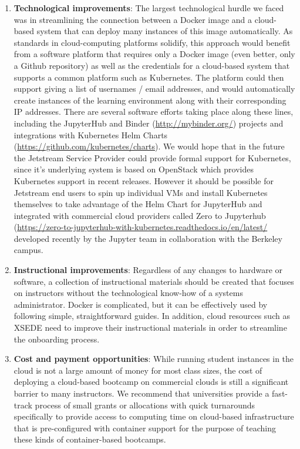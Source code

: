 \begin{enumerate}

\item {\bf Technological improvements}: The largest technological hurdle we
faced was in streamlining the connection between a Docker image and a
cloud-based system that can deploy many instances of this image automatically.
As standards in cloud-computing platforms solidify, this approach would
benefit from a software platform that requires only a Docker image (even better,
only a Github repository) as well as the credentials for a cloud-based system
that supports a common platform such as Kubernetes. The platform could then
support giving a list of usernames / email addresses, and would automatically
create instances of the learning environment along with their corresponding IP
addresses. There are several software efforts taking place along these
lines, including the JupyterHub \cite{perez2015project} and Binder (\url{http://mybinder.org/})
projects and integrations with Kubernetes Helm Charts (\url{https://github.com/kubernetes/charts}).
We would hope that in the future the Jetstream Service Provider could provide
formal support for Kubernetes, since it's underlying system is based on OpenStack
which provides Kubernetes support in recent releases.
However it should be possible for Jetstream end users to spin up individual VMs
and install Kubernetes themselves to take advantage of the Helm Chart for JupyterHub
and integrated with commercial cloud providers called Zero to Jupyterhub
(\url{https://zero-to-jupyterhub-with-kubernetes.readthedocs.io/en/latest/}
developed recently by the Jupyter team in collaboration with the Berkeley campus.

\item {\bf Instructional improvements}: Regardless of any changes to hardware
or software, a collection of instructional materials should be created that
focuses on instructors without the technological know-how of a systems administrator.
Docker is complicated, but it can be effectively used by following simple,
straightforward guides. In addition, cloud resources such as XSEDE need to
improve their instructional materials in order to
streamline the onboarding process.

\item {\bf Cost and payment opportunities}: While running student instances in the cloud
is not a large amount of money for most class sizes, the
cost of deploying a cloud-based bootcamp on commercial clouds is still a
significant barrier to many instructors. We recommend that universities provide
a fast-track process of small grants or allocations with quick turnarounds
specifically to provide access to computing time on cloud-based infrastructure
that is pre-configured with container support for the purpose of teaching
these kinds of container-based bootcamps.


\end{enumerate}

